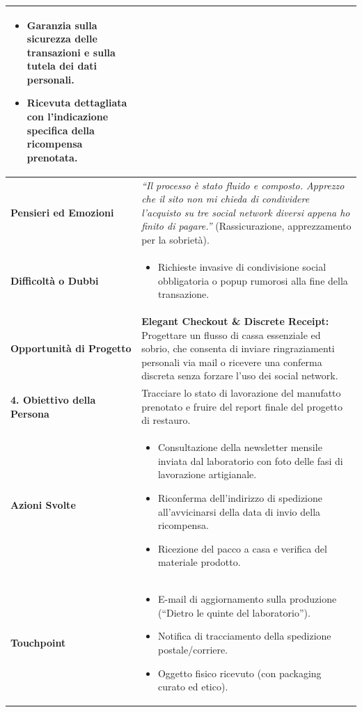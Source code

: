 \documentclass[11pt,a4paper]{article}
\begin{document}
\begin{table}[h!]
\begin{tabular}{|p{3.2cm}|p{11.8cm}|}
\begin{itemize}[leftmargin=*,nosep]
    \item Garanzia sulla sicurezza delle transazioni e sulla tutela dei dati personali.
    \item Ricevuta dettagliata con l'indicazione specifica della ricompensa prenotata.
\end{itemize} \\ \hline
\textbf{Pensieri ed Emozioni} &
\textit{``Il processo è stato fluido e composto. Apprezzo che il sito non mi chieda di condividere l'acquisto su tre social network diversi appena ho finito di pagare.''} (Rassicurazione, apprezzamento per la sobrietà). \\ \hline
\textbf{Difficoltà o Dubbi} &
\begin{itemize}[leftmargin=*,nosep]
    \item Richieste invasive di condivisione social obbligatoria o popup rumorosi alla fine della transazione.
\end{itemize} \\ \hline
\textbf{Opportunità di Progetto} &
\textbf{Elegant Checkout \& Discrete Receipt:} Progettare un flusso di cassa essenziale ed sobrio, che consenta di inviare ringraziamenti personali via mail o ricevere una conferma discreta senza forzare l'uso dei social network. \\ \hline
\hline
\textbf{4. Obiettivo della Persona} & Tracciare lo stato di lavorazione del manufatto prenotato e fruire del report finale del progetto di restauro. \\ \hline
\textbf{Azioni Svolte} &
\begin{itemize}[leftmargin=*,nosep]
    \item Consultazione della newsletter mensile inviata dal laboratorio con foto delle fasi di lavorazione artigianale.
    \item Riconferma dell'indirizzo di spedizione all'avvicinarsi della data di invio della ricompensa.
    \item Ricezione del pacco a casa e verifica del materiale prodotto.
\end{itemize} \\ \hline
\textbf{Touchpoint} &
\begin{itemize}[leftmargin=*,nosep]
    \item E-mail di aggiornamento sulla produzione (``Dietro le quinte del laboratorio'').
    \item Notifica di tracciamento della spedizione postale/corriere.
    \item Oggetto fisico ricevuto (con packaging curato ed etico).

\end{itemize}
\end{tabular}
\end{table}
\end{document}
